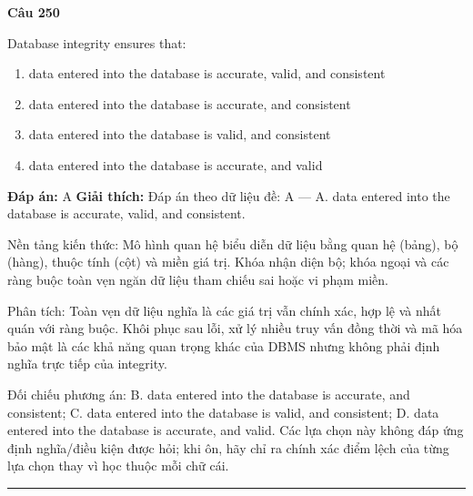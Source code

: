 \documentclass[11pt,a4paper]{article}
\newenvironment{question}[1]{%
  \par\vspace{1em}\noindent\textbf{\large Câu #1}\par\vspace{0.4em}
}{%
  \par\vspace{1em}\hrule\vspace{0.6em}
}
\newenvironment{choices}{%
  \begin{enumerate}[label=\textbf{\Alph*.},leftmargin=2.2em,itemsep=2pt,topsep=3pt]
}{%
  \end{enumerate}
}
\newcommand{\choice}{\item}
\begin{document}
\begin{question}{250}
Database integrity ensures that:
\begin{choices}
\choice data entered into the database is accurate, valid, and consistent
\choice data entered into the database is accurate, and consistent
\choice data entered into the database is valid, and consistent
\choice data entered into the database is accurate, and valid
\end{choices}
\textbf{Đáp án:} A
\textbf{Giải thích:} Đáp án theo dữ liệu đề: A — A. data entered into the database is accurate, valid, and consistent.

Nền tảng kiến thức: Mô hình quan hệ biểu diễn dữ liệu bằng quan hệ (bảng), bộ (hàng), thuộc tính (cột) và miền giá trị. Khóa nhận diện bộ; khóa ngoại và các ràng buộc toàn vẹn ngăn dữ liệu tham chiếu sai hoặc vi phạm miền.

Phân tích: Toàn vẹn dữ liệu nghĩa là các giá trị vẫn chính xác, hợp lệ và nhất quán với ràng buộc. Khôi phục sau lỗi, xử lý nhiều truy vấn đồng thời và mã hóa bảo mật là các khả năng quan trọng khác của DBMS nhưng không phải định nghĩa trực tiếp của integrity.

Đối chiếu phương án: B. data entered into the database is accurate, and consistent; C. data entered into the database is valid, and consistent; D. data entered into the database is accurate, and valid. Các lựa chọn này không đáp ứng định nghĩa/điều kiện được hỏi; khi ôn, hãy chỉ ra chính xác điểm lệch của từng lựa chọn thay vì học thuộc mỗi chữ cái.
\end{question}
\end{document}
